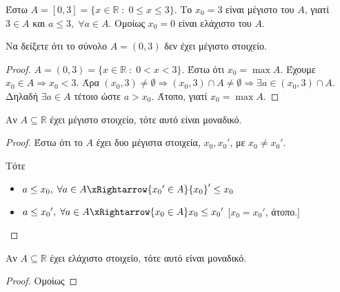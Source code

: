 \documentclass[main.tex]{subfiles}
\begin{document}
\begin{example}
    Έστω $ A = [0,3] = \{ x \in \mathbb{R} \; : \; 0 \leq x \leq 3 \} $. 
    Το $ x_{0}= 3 $ είναι μέγιστο του $A$, γιατί $ 3 \in A $ και 
    $ a \leq 3, \; \forall a \in A $. Ομοίως $ x_{0}= 0 $ είναι ελάχιστο 
    του $A$.
\end{example}

\begin{example}
    Να δείξετε ότι το σύνολο $ A = (0,3) $ δεν έχει μέγιστο στοιχείο.
\end{example}

\begin{proof}
\item {}
    $ A = (0,3) = \{ x \in \mathbb{R} \; : \; 0 < x < 3 \} $. 
Έστω ότι $ x_{0} = \max A $. Έχουμε  $ x_{0} \in A \Rightarrow  x_{0} 
< 3$. Άρα  $ (x_{0}, 3) \neq \emptyset \Rightarrow (x_{0},3) \cap A \neq 
\emptyset \Rightarrow \exists a \in (x_{0},3) \cap A $. Δηλαδή $ 
\exists a \in A$ τέτοιο ώστε $ a > x_{0} $. Άτοπο, γιατί $ x_{0}= \max A $.
\end{proof}

\begin{prop}
    Αν $ A \subseteq \mathbb{R} $ έχει μέγιστο στοιχείο, τότε αυτό είναι 
    μοναδικό.
\end{prop}

\begin{proof}
    Έστω ότι το $A$ έχει δυο μέγιστα στοιχεία,  $ x_{0}, {x_{0}}' $,  με 
    $ x_{0} \neq {x_{0}}'$. 

    Τότε 

    \begin{itemize}
        \item $ a \leq x_{0}, \; \forall a \in A \xRightarrow{{x_{0}}' 
            \in A } {x_{0}}'  \leq x_{0} $ 
        \item $ a \leq {x_{0}}', \; \forall a \in A \xRightarrow{x_{0} 
            \in A } x_{0} \leq {x_{0}}' $ 
            [$ x_{0} = {x_{0}}' $, άτοπο.] 
    \end{itemize}
\end{proof}

\begin{prop}
    Αν $ A \subseteq \mathbb{R} $ έχει ελάχιστο στοιχείο, τότε αυτό είναι 
    μοναδικό.
\end{prop}

\begin{proof}
   Ομοίως 
\end{proof}
\end{document}
